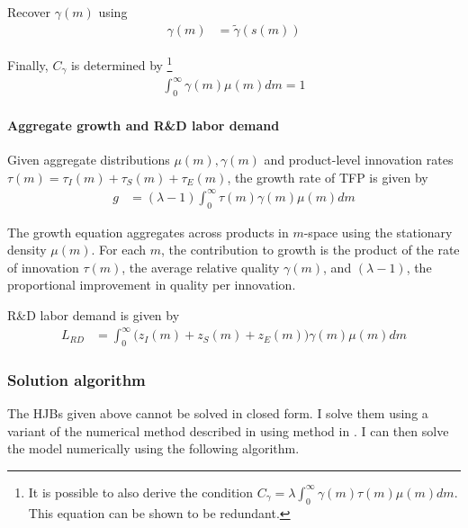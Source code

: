 \documentclass[11pt,english]{article}
\theoremstyle{remark}
\begin{document}
Recover $\gamma(m)$ using 
\begin{align}
	\gamma(m) &= \tilde{\gamma}(s(m))
\end{align}

Finally, $C_{\gamma}$ is determined by \footnote{It is possible to also derive the condition $C_{\gamma} = \lambda \int_0^{\infty} \gamma(m) \tau(m) \mu(m) dm$. This equation can be shown to be redundant.}
\begin{align}
	\int_0^{\infty} \gamma(m) \mu(m) dm = 1
\end{align}

\paragraph{Aggregate growth and R\&D labor demand}

Given aggregate distributions $\mu(m),\gamma(m)$ and product-level innovation rates $\tau(m) = \tau_I(m) + \tau_S(m) + \tau_E(m)$, the growth rate of TFP is given by
\begin{align}
	g &= (\lambda -1) \int_0^{\infty} \tau(m) \gamma(m) \mu(m) dm 
\end{align}

The growth equation aggregates across products in $m$-space using the stationary density $\mu(m)$. For each $m$, the contribution to growth is the product of the rate of innovation $\tau(m)$, the average relative quality $\gamma(m)$, and $(\lambda -1)$, the proportional improvement in quality per innovation.

R\&D labor demand is given by 
\begin{align*}
	L_{RD} &= \int_0^{\infty} \big (z_I(m) + z_S(m) + z_E(m)\big)\gamma(m)\mu(m) dm
\end{align*}

\subsubsection{Solution algorithm}\label{solution_algorithm}

The HJBs given above cannot be solved in closed form. I solve them using a variant of the numerical method described in using method in \cite{achdou_income_2017}. I can then solve the model numerically using the following algorithm.
\end{document}
